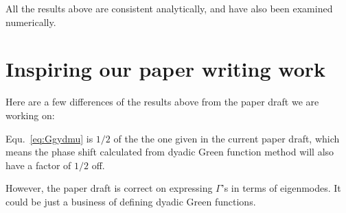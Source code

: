 \documentclass[preprint,aps,pra,onecolumn]{revtex4-1}
\begin{document}
All the results above are consistent analytically, and have also been examined numerically.  


\section{Inspiring our paper writing work}
Here are a few differences of the results above from the paper draft we are working on:

Equ.~\eqref{eq:Ggydmu} is $ 1/2 $ of the the one given in the current paper draft, which means the phase shift calculated from dyadic Green function method will also have a factor of $ 1/2 $ off. 

However, the paper draft is correct on expressing $ \Gamma $'s in terms of eigenmodes. It could be just a business of defining dyadic Green functions. 





%
%

%
\ifwindows
	
\else
	
\fi
\end{document}
